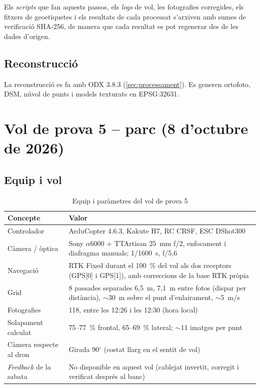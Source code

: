 Els \emph{scripts} que fan aquests passos, els \emph{logs} de vol, les fotografies corregides, els fitxers de geoetiquetes i els resultats de cada processat s'arxiven amb sumes de verificació SHA-256, de manera que cada resultat es pot regenerar des de les dades d'origen.

\subsection{Reconstrucció}

La reconstrucció es fa amb ODX 3.8.3 (\cref{sec:processament}). Es generen ortofoto, DSM, núvol de punts i models texturats en EPSG:32631.

\section{Vol de prova 5 -- parc (8 d'octubre de 2026)}
\label{sec:vol5}

\subsection{Equip i vol}

\begin{table}[H]
    \centering
    \caption{Equip i paràmetres del vol de prova 5}
    \label{tab:vol5-equip}
    \small
    \begin{tabular}{lP{9.6cm}}
        \toprule
        Concepte & Valor \\
        \midrule
        Controlador & ArduCopter 4.6.3, Kakute H7, RC CRSF, ESC DShot300 \\
        Càmera / òptica & Sony $\alpha$6000 + TTArtisan 25~mm f/2, enfocament i diafragma manuals; 1/1600~s, f/5,6 \\
        Navegació & RTK Fixed durant el 100~\% del vol als dos receptors (GPS[0] i GPS[1]), amb correccions de la base RTK pròpia \\
        Grid & 8 passades separades 6,5~m, 7,1~m entre fotos (dispar per distància), $\sim$30~m sobre el punt d'enlairament, $\sim$5~m/s \\
        Fotografies & 118, entre les 12:26 i les 12:30 (hora local) \\
        Solapament calculat & 75--77~\% frontal, 65--69~\% lateral; $\sim$11 imatges per punt \\
        Càmera respecte al dron & Girada 90$^{\circ}$ (costat llarg en el sentit de vol) \\
        \emph{Feedback} de la sabata & No disponible en aquest vol (cablejat invertit, corregit i verificat després al banc) \\
        \bottomrule
    \end{tabular}
\end{table}

